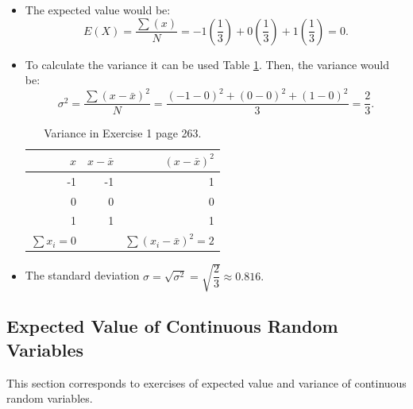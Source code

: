\documentclass[10pt,leter,openany]{article}
\begin{document}
\begin{itemize}
	\item The expected value would be:
	\begin{equation*}
		E(X) = \dfrac{\sum(x)}{N} = -1\left( \dfrac{1}{3}\right)  + 0\left( \dfrac{1}{3}\right) +1\left( \dfrac{1}{3}\right) = 0.
	\end{equation*}

\item To calculate the variance it can be used Table \ref{tab:ex1p263}. Then, the variance would be:
\begin{equation*}
	\sigma^2 = \dfrac{\sum\left( x-\bar{x}\right) ^2}{N} = \dfrac{\left( -1-0\right) ^2 + \left( 0-0\right) ^2 + \left( 1-0\right) ^2}{3} = \dfrac{2}{3}.
\end{equation*}

\begin{table}[]
	\centering
	\caption{Variance in Exercise 1 page 263.}
	\label{tab:ex1p263}
	\begin{tabular}{@{}rrr@{}}
		\toprule
		$x $                              &  $x-\bar{x}$        & $\left( x-\bar{x}\right) ^2$            \\ \midrule
		-1                                          & -1                   & 1                          \\
		0                                           & 0                    & 0                          \\
		1                                           & 1                    & 1                          \\ \midrule
		\multicolumn{1}{c}{$\sum x_{i} = 0$} & \multicolumn{1}{c}{} & \multicolumn{1}{c}{$\sum \left( x_{i}-\bar{x} \right)^2 = 2$} \\ \bottomrule
	\end{tabular}
\end{table}

\item The standard deviation $ \sigma = \sqrt{\sigma^2}= \sqrt{\dfrac{2}{3}} \approx 0.816.$ 
\end{itemize}

	\subsection{Expected Value of Continuous Random Variables}
	
	This section corresponds to exercises of expected value and variance of continuous random variables.
	
\end{document}
